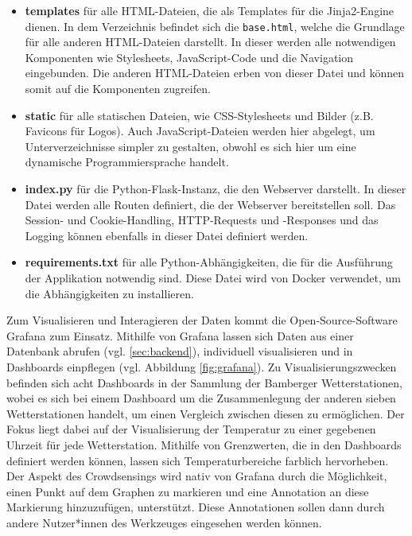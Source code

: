 \begin{itemize}
    \item \textbf{templates} für alle HTML-Dateien, die als Templates für die Jinja2-Engine dienen. In dem Verzeichnis befindet sich die \texttt{base.html}, welche die Grundlage für alle anderen HTML-Dateien darstellt. In dieser werden alle notwendigen Komponenten wie Stylesheets, JavaScript-Code und die Navigation eingebunden. Die anderen HTML-Dateien erben von dieser Datei und können somit auf die Komponenten zugreifen.
    \item \textbf{static} für alle statischen Dateien, wie CSS-Stylesheets und Bilder (z.B. Favicons für Logos). Auch JavaScript-Dateien werden hier abgelegt, um Unterverzeichnisse simpler zu gestalten, obwohl es sich hier um eine dynamische Programmiersprache handelt.
    \item \textbf{index.py} für die Python-Flask-Instanz, die den Webserver darstellt. In dieser Datei werden alle Routen definiert, die der Webserver bereitstellen soll. Das Session- und Cookie-Handling, HTTP-Requests und -Responses und das Logging können ebenfalls in dieser Datei definiert werden.
    \item \textbf{requirements.txt} für alle Python-Abhängigkeiten, die für die Ausführung der Applikation notwendig sind. Diese Datei wird von Docker verwendet, um die Abhängigkeiten zu installieren.
\end{itemize}

Zum Visualisieren und Interagieren der Daten kommt die Open-Source-Software Grafana zum Einsatz. Mithilfe von Grafana lassen sich Daten aus einer Datenbank abrufen (vgl. \ref{sec:backend}), individuell visualisieren und in Dashboards einpflegen (vgl. Abbildung \ref{fig:grafana}). Zu Visualisierungszwecken befinden sich acht Dashboards in der Sammlung der Bamberger Wetterstationen, wobei es sich bei einem Dashboard um die Zusammenlegung der anderen sieben Wetterstationen handelt, um einen Vergleich zwischen diesen zu ermöglichen. Der Fokus liegt dabei auf der Visualisierung der Temperatur zu einer gegebenen Uhrzeit für jede Wetterstation. Mithilfe von Grenzwerten, die in den Dashboards definiert werden können, lassen sich Temperaturbereiche farblich hervorheben. Der Aspekt des Crowdsensings wird nativ von Grafana durch die Möglichkeit, einen Punkt auf dem Graphen zu markieren und eine Annotation an diese Markierung hinzuzufügen, unterstützt. Diese Annotationen sollen dann durch andere Nutzer*innen des Werkzeuges eingesehen werden können.

